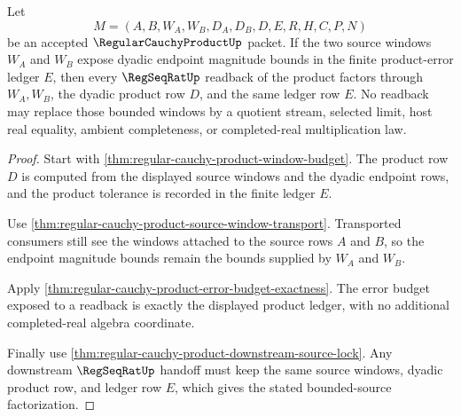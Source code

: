 \begin{theorem}
\label{thm:regular-cauchy-product-bounded-source-handoff}
Let
$$
M=(A,B,W_A,W_B,D_A,D_B,D,E,R,H,C,P,N)
$$
be an accepted $\RegularCauchyProductUp$ packet. If the two source windows
$W_A$ and $W_B$ expose dyadic endpoint magnitude bounds in the finite
product-error ledger $E$, then every $\RegSeqRatUp$ readback of the product
factors through $W_A,W_B$, the dyadic product row $D$, and the same ledger row
$E$. No readback may replace those bounded windows by a quotient stream,
selected limit, host real equality, ambient completeness, or completed-real
multiplication law.
\end{theorem}
\begin{proof}
Start with \autoref{thm:regular-cauchy-product-window-budget}. The product
row $D$ is computed from the displayed source windows and the dyadic endpoint
rows, and the product tolerance is recorded in the finite ledger $E$.

Use \autoref{thm:regular-cauchy-product-source-window-transport}. Transported
consumers still see the windows attached to the source rows $A$ and $B$, so
the endpoint magnitude bounds remain the bounds supplied by $W_A$ and $W_B$.

Apply \autoref{thm:regular-cauchy-product-error-budget-exactness}. The error
budget exposed to a readback is exactly the displayed product ledger, with no
additional completed-real algebra coordinate.

Finally use \autoref{thm:regular-cauchy-product-downstream-source-lock}. Any
downstream $\RegSeqRatUp$ handoff must keep the same source windows, dyadic
product row, and ledger row $E$, which gives the stated bounded-source
factorization.
\end{proof}

